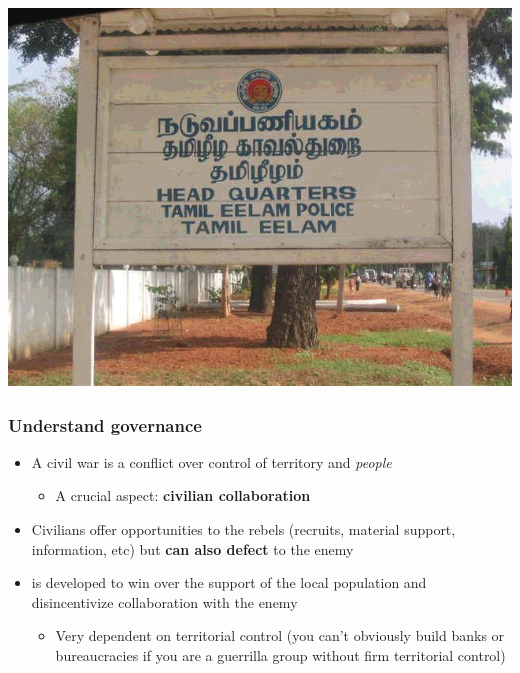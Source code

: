 \documentclass[aspectratio=43]{beamer}
\begin{document}
\begin{frame}
\begin{minipage}{0.59\textwidth}
  \includegraphics[width = .8\textwidth]{img/tamileelam_police}
\end{minipage}

\end{frame}

\begin{frame}
\frametitle{Understand governance}
\centering

\begin{itemize}
  \item<1-> A civil war is a conflict over control of territory and \textit{people}
  \begin{itemize}
    \item A crucial aspect: \textbf{civilian collaboration}
  \end{itemize}
  \item<2-> Civilians offer opportunities to the rebels (recruits, material support, information, etc) but \textbf{can also defect} to the enemy
  \item<3->  is developed to win over the support of the local population and disincentivize collaboration with the enemy
  \begin{itemize}
    \item<4-> Very dependent on territorial control (you can't obviously build banks or bureaucracies if you are a guerrilla group without firm territorial control)
  \end{itemize}
\end{itemize}

\end{frame}
\end{document}
